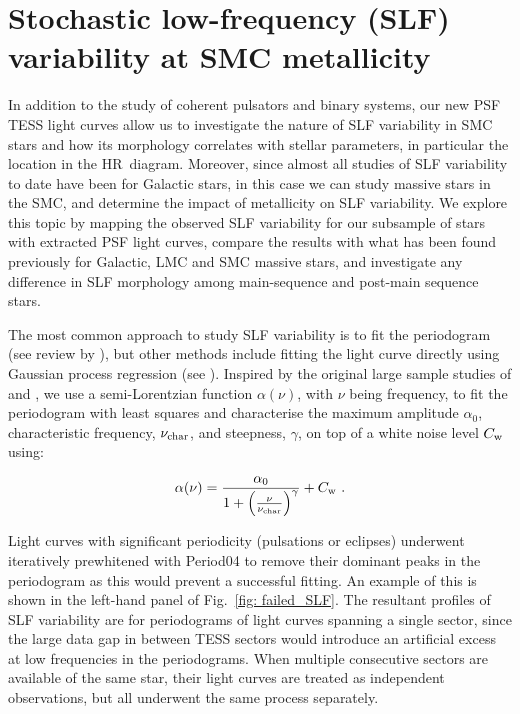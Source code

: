 \documentclass[fleqn,usenatbib]{mnras}
\begin{document}
\section{Stochastic low-frequency (SLF) variability at SMC metallicity}
\label{sec:SLF}

In addition to the study of coherent pulsators and binary systems, our new PSF TESS light curves allow us to investigate the nature of SLF variability in SMC stars and how its morphology correlates with stellar parameters, in particular the location in the HR~diagram. Moreover, since almost all studies of SLF variability to date have been for Galactic stars, in this case we can study massive stars in the SMC, and determine the impact of metallicity on SLF variability. We explore this topic by mapping the observed SLF variability for our subsample of stars with extracted PSF light curves, compare the results with what has been found previously for Galactic, LMC and SMC massive stars, and investigate any difference in SLF morphology among main-sequence and post-main sequence stars.

The most common approach to study SLF variability is to fit the periodogram (see review by \citealt{Bowman2023}), but other methods include fitting the light curve directly using Gaussian process regression (see \citealt{BowmanDW2022}). Inspired by the original large sample studies of \citet{Bowman+2019_nat} and \citet{Bowman+2019_corot}, we use a semi-Lorentzian function $\alpha(\nu)$, with $\nu$ being frequency, to fit the periodogram with least squares and characterise the maximum amplitude $\alpha_0$, characteristic frequency, $\nu_{\rm char}$, and steepness, $\gamma$, on top of a white noise level $C_{\rm w}$ using:

\begin{equation}\label{eq:SLF}
    \alpha(\nu) = \frac{\alpha_0}{1+\left(\frac{\nu}{\nu_{\rm char}}\right)^{\gamma}} + C_{\rm w} ~ .
\end{equation}

Light curves with significant periodicity (pulsations or eclipses) underwent iteratively prewhitened with {\sc Period04} \citep{period04_2005} to remove their dominant peaks in the periodogram as this would prevent a successful fitting. An example of this is shown in the left-hand panel of Fig.~\ref{fig: failed_SLF}. The resultant profiles of SLF variability are for periodograms of light curves spanning a single sector, since the large data gap in between TESS sectors would introduce an artificial excess at low frequencies in the periodograms. When multiple consecutive sectors are available of the same star, their light curves are treated as independent observations, but all underwent the same process separately.
\end{document}
